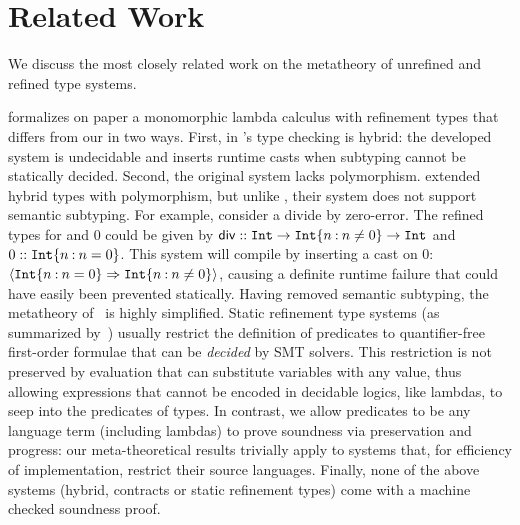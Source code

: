 \section{Related Work}
\label{sec:related}

We discuss the most closely related work
on the metatheory of unrefined and refined
type systems.



%
\citet{flanagan06} formalizes on paper
a monomorphic lambda calculus with
refinement types that differs from our \sysrf
in two ways.
%
First, in \citet{flanagan06}'s type checking
is hybrid: the developed system
is undecidable and inserts runtime
casts when subtyping cannot
be statically decided.
%
Second, the original system lacks polymorphism.
%
\citet{SekiyamaIG17} extended hybrid types
with polymorphism, but unlike \sysrf,
their system does not support semantic subtyping.
%
For example, consider a divide by zero-error.
The refined types for  and 0 could
be given by
$\mathsf{div} :: \texttt{Int} \rightarrow {\ensuremath{{\texttt{Int}}\{n \mathbin{:} n \neq 0\}}} \rightarrow {\ensuremath{\texttt{Int}}}$
and $0 :: {{\texttt{Int}}\{n \mathbin{:} n=0\}}$.
This system will compile 
by inserting a cast on 0:
$\langle{\ensuremath{{\texttt{Int}}\{n \mathbin{:} n=0\}}} \Rightarrow {\ensuremath{{\texttt{Int}}\{n \mathbin{:} n\neq 0\}}}\rangle$,
causing a definite runtime failure
that could have easily been prevented
statically.
%
Having removed semantic subtyping,
the metatheory of~\citet{SekiyamaIG17}
is highly simplified.
%
%
Static refinement type systems
(as summarized by~\citet{sprite})
usually restrict the definition
of predicates to quantifier-free
first-order formulae that can be
\emph{decided} by SMT solvers.
%
This restriction is not preserved
by evaluation that can substitute
variables with any value, thus
allowing expressions that cannot
be encoded in decidable logics, like
lambdas, to seep into the predicates of types.
%
In contrast, we allow predicates to be
any language term (including lambdas)
to prove soundness via preservation
and progress: our meta-theoretical
results trivially apply to systems that,
for efficiency of implementation, restrict
their source languages.
%
Finally, none of the above systems (hybrid,
contracts or static refinement types) come
with a machine checked soundness proof.

